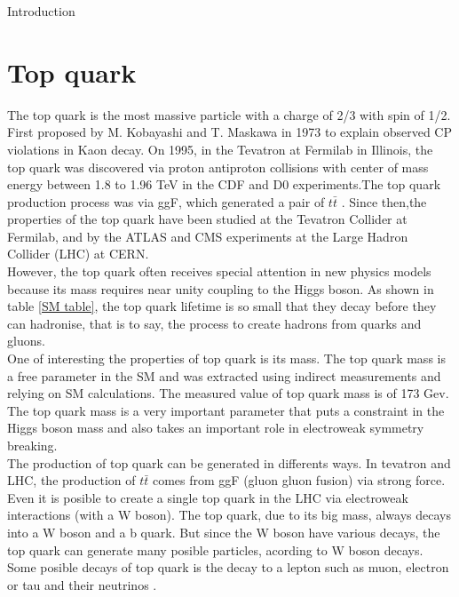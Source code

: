 \begin{chapter}{Introduction}
\pagebreak

\section{Top quark}
The top quark  is the most massive particle  with a charge of 2/3 with spin of 1/2. First proposed by  M. Kobayashi and T. Maskawa in 1973 to explain observed CP violations in Kaon decay\cite{griff}. On 1995, in the Tevatron at Fermilab in Illinois, the top quark  was discovered via proton antiproton collisions with center of mass energy between 1.8 to 1.96 TeV in the CDF and D0 experiments.The top quark production process was via ggF, which generated a pair of $t\bar{t}$\cite{top} .
Since then,the properties of the top quark have been studied at the Tevatron Collider at Fermilab, and by the ATLAS and CMS experiments at the Large Hadron Collider (LHC) at CERN.\\
However, the top quark often receives special attention in new physics models because its mass requires near unity coupling to the Higgs boson\cite{top}.
As shown in table \ref{SM table}, the top quark lifetime is so small that they decay before they can hadronise, that is to say, the process to create hadrons from quarks and gluons.\\

One of  interesting the properties of top quark is its mass.
The top quark mass is a free parameter in the SM and was extracted using indirect measurements and relying on SM calculations. The measured value of top quark mass is of 173 Gev\cite{pd}.
The top quark mass is a very important
parameter that puts a constraint in the Higgs boson mass and also takes an important role in electroweak symmetry breaking\cite{top}.\\

The production of top quark can be generated in differents ways. In tevatron and LHC, the production of $t\bar{t}$ comes from ggF (gluon gluon fusion) via strong force. Even it is posible to create a single top quark in the LHC via electroweak interactions (with a W boson)\cite{th1}.  
The top quark, due to its big mass, always decays into a W boson and a b quark. But since the W boson have various decays, the top quark can generate many posible particles, acording to W boson decays. Some posible decays of top quark is the decay to a lepton such as muon, electron or tau and their neutrinos . %


\end{chapter}
